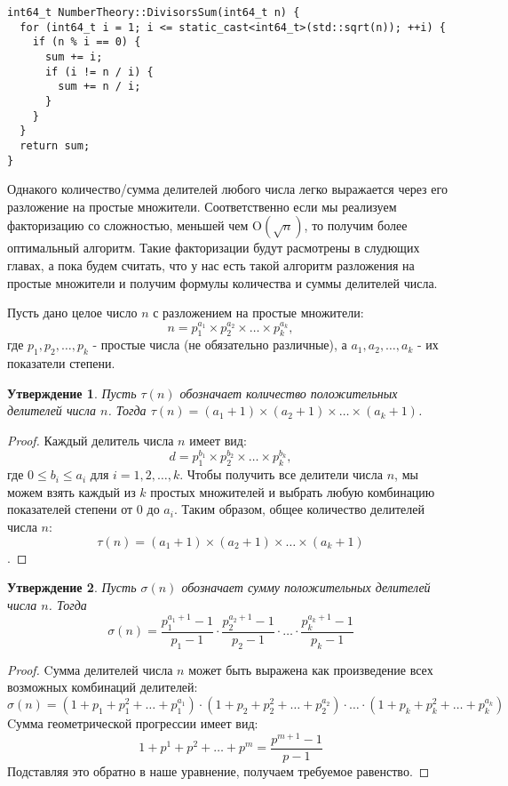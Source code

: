 \documentclass[12pt, a4paper, openany]{book}
\newtheorem*{statement}{Утверждение}
\begin{document}
\newpage
\begin{lstlisting}[breaklines=true]
int64_t NumberTheory::DivisorsSum(int64_t n) {
  for (int64_t i = 1; i <= static_cast<int64_t>(std::sqrt(n)); ++i) {
    if (n % i == 0) {
      sum += i;
      if (i != n / i) {
        sum += n / i;
      }
    }
  }
  return sum;
}
\end{lstlisting}

Однакого количество/сумма делителей любого числа легко выражается через его разложение на простые множители. Соответственно если мы реализуем факторизацию со сложностью, меньшей чем $\text{O}(\sqrt{n})$, то получим более оптимальный алгоритм. Такие факторизации будут расмотрены в слудющих главах, а пока будем считать, что у нас есть такой алгоритм разложения на простые множители и получим формулы количества и суммы делителей числа.

\noindent
Пусть дано целое число $ n $ с разложением на простые множители:
\[n = p_1^{a_1} \times p_2^{a_2} \times \ldots \times p_k^{a_k},\]
\noindent
где $ p_1, p_2, \ldots, p_k $ - простые числа (не обязательно различные), а $ a_1, a_2, \ldots, a_k $ - их показатели степени.

\begin{statement}
Пусть $\tau(n)$ обозначает количество положительных делителей числа $n$. Тогда $\tau(n) = (a_1 + 1) \times (a_2 + 1) \times \ldots \times (a_k + 1)$.
\end{statement}

\begin{proof}
Каждый делитель числа $ n $ имеет вид:
\[ d = p_1^{b_1} \times p_2^{b_2} \times \ldots \times p_k^{b_k},\]
\noindent
где $ 0 \leq b_i \leq a_i $ для $ i = 1, 2, \ldots, k $. Чтобы получить все делители числа $ n $, мы можем взять каждый из $ k $ простых множителей и выбрать любую комбинацию показателей степени от 0 до $ a_i $. Таким образом, общее количество делителей числа $ n $:
\[\tau(n) = (a_1 + 1) \times (a_2 + 1) \times \ldots \times (a_k + 1)\].
\end{proof}

\newpage

\begin{statement}
Пусть $\sigma(n)$ обозначает сумму положительных делителей числа $n$. Тогда \[
\sigma(n) = \frac{{p_1^{a_1+1} - 1}}{{p_1 - 1}} \cdot \frac{{p_2^{a_2+1} - 1}}{{p_2 - 1}} \cdot \ldots \cdot \frac{{p_k^{a_k+1} - 1}}{{p_k - 1}}
\]
\end{statement}

\begin{proof}
Cумма делителей числа \( n \) может быть выражена как произведение всех возможных комбинаций делителей:
\[
\sigma(n) = (1 + p_1 + p_1^2 + \ldots + p_1^{a_1}) \cdot (1 + p_2 + p_2^2 + \ldots + p_2^{a_2}) \cdot \ldots \cdot (1 + p_k + p_k^2 + \ldots + p_k^{a_k})
\]
\noindent
Cумма геометрической прогрессии имеет вид:
\[
1 + p^1 + p^2 + \ldots + p^m = \frac{{p^{m+1} - 1}}{{p - 1}}
\]
\noindent
Подставляя это обратно в наше уравнение, получаем требуемое равенство.
\end{proof}
\end{document}

